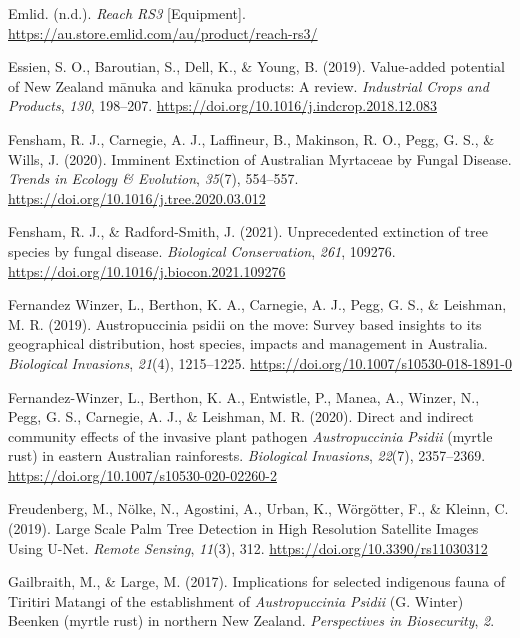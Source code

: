 \documentclass[
]{scrreprt}
\newlength{\cslhangindent}
\newenvironment{CSLReferences}[2] %
 {\begin{list}{}{%
  \setlength{\itemindent}{0pt}
  \setlength{\leftmargin}{0pt}
  \setlength{\parsep}{0pt}
  \setlength{\baselineskip}{12pt}
  \ifodd #1
   \setlength{\leftmargin}{\cslhangindent}
   \setlength{\itemindent}{-1\cslhangindent}
  \fi
  \setlength{\itemsep}{4pt}}}
 {\end{list}}
\begin{document}
\begin{CSLReferences}{1}{0}
Emlid. (n.d.). \emph{Reach {RS3}} {[}Equipment{]}.
\url{https://au.store.emlid.com/au/product/reach-rs3/}

Essien, S. O., Baroutian, S., Dell, K., \& Young, B. (2019). Value-added
potential of {New Zealand} mānuka and kānuka products: {A} review.
\emph{Industrial Crops and Products}, \emph{130}, 198--207.
\url{https://doi.org/10.1016/j.indcrop.2018.12.083}

Fensham, R. J., Carnegie, A. J., Laffineur, B., Makinson, R. O., Pegg,
G. S., \& Wills, J. (2020). Imminent {Extinction} of {Australian
Myrtaceae} by {Fungal Disease}. \emph{Trends in Ecology \& Evolution},
\emph{35}(7), 554--557. \url{https://doi.org/10.1016/j.tree.2020.03.012}

Fensham, R. J., \& Radford-Smith, J. (2021). Unprecedented extinction of
tree species by fungal disease. \emph{Biological Conservation},
\emph{261}, 109276. \url{https://doi.org/10.1016/j.biocon.2021.109276}

Fernandez Winzer, L., Berthon, K. A., Carnegie, A. J., Pegg, G. S., \&
Leishman, M. R. (2019). Austropuccinia psidii on the move: Survey based
insights to its geographical distribution, host species, impacts and
management in {Australia}. \emph{Biological Invasions}, \emph{21}(4),
1215--1225. \url{https://doi.org/10.1007/s10530-018-1891-0}

Fernandez-Winzer, L., Berthon, K. A., Entwistle, P., Manea, A., Winzer,
N., Pegg, G. S., Carnegie, A. J., \& Leishman, M. R. (2020). Direct and
indirect community effects of the invasive plant pathogen
{\emph{Austropuccinia}}{ \emph{Psidii}} (myrtle rust) in eastern
{Australian} rainforests. \emph{Biological Invasions}, \emph{22}(7),
2357--2369. \url{https://doi.org/10.1007/s10530-020-02260-2}

Freudenberg, M., Nölke, N., Agostini, A., Urban, K., Wörgötter, F., \&
Kleinn, C. (2019). Large {Scale Palm Tree Detection} in {High Resolution
Satellite Images Using U-Net}. \emph{Remote Sensing}, \emph{11}(3), 312.
\url{https://doi.org/10.3390/rs11030312}

Gailbraith, M., \& Large, M. (2017). Implications for selected
indigenous fauna of {Tiritiri Matangi} of the establishment of
{\emph{Austropuccinia}}{ \emph{Psidii}} ({G}. {Winter}) {Beenken}
(myrtle rust) in northern {New Zealand}. \emph{Perspectives in
Biosecurity}, \emph{2}.


\end{CSLReferences}
\end{document}
